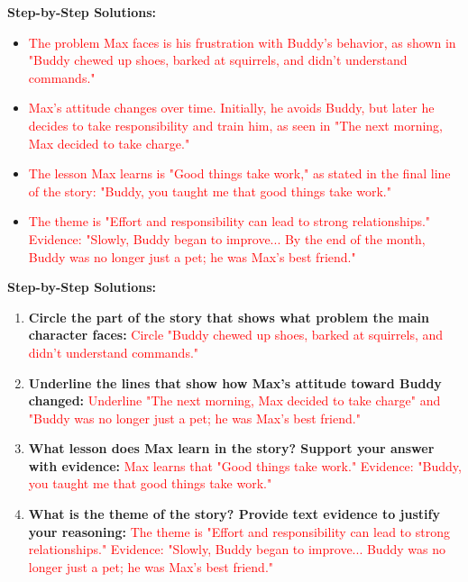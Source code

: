 \documentclass[12pt]{article}
\begin{document}
\begin{tcolorbox}[colframe=black!60, colback=white, 
coltitle=black, colbacktitle=black!15, fonttitle=\bfseries\Large, 
title=Max's Buddy, halign title=center, left=10pt, right=10pt, top=10pt, bottom=15pt]

\textbf{Step-by-Step Solutions:}
\begin{itemize}
    \item \textcolor{red}{The problem Max faces is his frustration with Buddy's behavior, as shown in "Buddy chewed up shoes, barked at squirrels, and didn’t understand commands."}
    \item \textcolor{red}{Max's attitude changes over time. Initially, he avoids Buddy, but later he decides to take responsibility and train him, as seen in "The next morning, Max decided to take charge."}
    \item \textcolor{red}{The lesson Max learns is "Good things take work," as stated in the final line of the story: "Buddy, you taught me that good things take work."}
    \item \textcolor{red}{The theme is "Effort and responsibility can lead to strong relationships." Evidence: "Slowly, Buddy began to improve... By the end of the month, Buddy was no longer just a pet; he was Max’s best friend."}
\end{itemize}

\end{tcolorbox}

\begin{tcolorbox}[colframe=black!60, colback=white, 
coltitle=black, colbacktitle=black!15, fonttitle=\bfseries\Large, 
title=Independent Practice, halign title=center, left=10pt, right=10pt, top=10pt, bottom=15pt]

\textbf{Step-by-Step Solutions:}
\begin{enumerate}[itemsep=1em]
    \item \textbf{Circle the part of the story that shows what problem the main character faces:} \textcolor{red}{Circle "Buddy chewed up shoes, barked at squirrels, and didn’t understand commands."}
    \item \textbf{Underline the lines that show how Max's attitude toward Buddy changed:} \textcolor{red}{Underline "The next morning, Max decided to take charge" and "Buddy was no longer just a pet; he was Max’s best friend."}
    \item \textbf{What lesson does Max learn in the story? Support your answer with evidence:} \textcolor{red}{Max learns that "Good things take work." Evidence: "Buddy, you taught me that good things take work."}
    \item \textbf{What is the theme of the story? Provide text evidence to justify your reasoning:} \textcolor{red}{The theme is "Effort and responsibility can lead to strong relationships." Evidence: "Slowly, Buddy began to improve... Buddy was no longer just a pet; he was Max’s best friend."}
\end{enumerate}

\end{tcolorbox}
\end{document}

